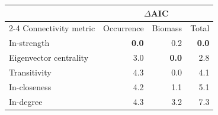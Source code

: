\begin{tabular}{lrrr}
\toprule
 & \multicolumn{3}{c}{$\Delta$AIC} \\
\cmidrule(lr){2-4}
Connectivity metric & Occurrence & Biomass & Total \\
\midrule
In-strength & \textbf{0.0} & 0.2 & \textbf{0.0} \\
Eigenvector centrality & 3.0 & \textbf{0.0} & 2.8 \\
Transitivity & 4.3 & 0.0 & 4.1 \\
In-closeness & 4.2 & 1.1 & 5.1 \\
In-degree & 4.3 & 3.2 & 7.3 \\
\bottomrule
\end{tabular}
